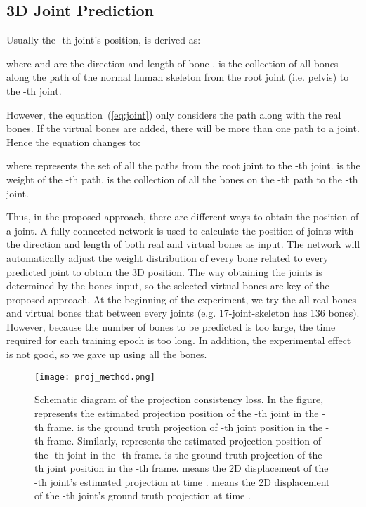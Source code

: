 \documentclass[journal]{IEEEtran}
\begin{document}
\subsection{3D Joint Prediction}
\label{subsection:3.2}
Usually the -th joint's position,  is derived as:

where  and  are the direction and length of bone .  is the collection of all bones along the path of the normal human skeleton from the root joint (i.e. pelvis) to the -th joint.

However, the equation~(\ref{eq:joint}) only considers the path along with the real bones. If the virtual bones are added, there will be more than one path to a joint. Hence the equation changes to:

where  represents the set of all the paths from the root joint to the -th joint.  is the weight of the -th path.  is the collection of all the bones on the -th path to the -th joint.

Thus, in the proposed approach, there are different ways to obtain the position of a joint. A fully connected network is used to calculate the position of joints with the direction and length of both real and virtual bones as input. The network will automatically adjust the weight distribution of every bone related to every predicted joint to obtain the 3D position. The way obtaining the joints is determined by the bones input, so the selected virtual bones are key of the proposed approach. At the beginning of the experiment, we try the all real bones and virtual bones that between every joints (e.g. 17-joint-skeleton has 136 bones). However, because the number of bones to be predicted is too large, the time required for each training epoch is too long. In addition, the experimental effect is not good, so we gave up using all the bones.




\begin{figure}
	\centering
	\texttt{[image: proj\_method.png]}
	\vspace{-0pt}
	\caption{Schematic diagram of the projection consistency loss. In the figure,  represents the estimated projection position of the -th joint in the -th frame.   is the ground truth projection of -th joint position in the -th frame. Similarly,  represents the estimated projection position of the -th joint in the -th frame.  is the ground truth projection of the -th joint position in the -th frame.  means the 2D displacement of the -th joint's estimated projection at time .  means the 2D displacement of the -th joint's ground truth projection at time .} 
	\vspace{-0pt}
	\label{fig:proj method}
\end{figure}
\end{document}
